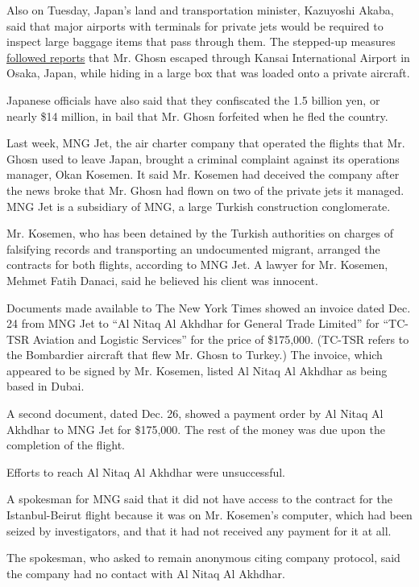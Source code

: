 Also on Tuesday, Japan's land and transportation minister, Kazuyoshi
Akaba, said that major airports with terminals for private jets would be
required to inspect large baggage items that pass through them. The
stepped-up measures
\href{https://www.nytimes.com/2019/12/31/business/carlos-ghosn.html}{followed
reports} that Mr. Ghosn escaped through Kansai International Airport in
Osaka, Japan, while hiding in a large box that was loaded onto a private
aircraft.

Japanese officials have also said that they confiscated the 1.5 billion
yen, or nearly \$14 million, in bail that Mr. Ghosn forfeited when he
fled the country.

Last week, MNG Jet, the air charter company that operated the flights
that Mr. Ghosn used to leave Japan, brought a criminal complaint against
its operations manager, Okan Kosemen. It said Mr. Kosemen had deceived
the company after the news broke that Mr. Ghosn had flown on two of the
private jets it managed. MNG Jet is a subsidiary of MNG, a large Turkish
construction conglomerate.

Mr. Kosemen, who has been detained by the Turkish authorities on charges
of falsifying records and transporting an undocumented migrant, arranged
the contracts for both flights, according to MNG Jet. A lawyer for Mr.
Kosemen, Mehmet Fatih Danaci, said he believed his client was innocent.

Documents made available to The New York Times showed an invoice dated
Dec. 24 from MNG Jet to ``Al Nitaq Al Akhdhar for General Trade
Limited'' for ``TC-TSR Aviation and Logistic Services'' for the price of
\$175,000. (TC-TSR refers to the Bombardier aircraft that flew Mr. Ghosn
to Turkey.) The invoice, which appeared to be signed by Mr. Kosemen,
listed Al Nitaq Al Akhdhar as being based in Dubai.

A second document, dated Dec. 26, showed a payment order by Al Nitaq Al
Akhdhar to MNG Jet for \$175,000. The rest of the money was due upon the
completion of the flight.

Efforts to reach Al Nitaq Al Akhdhar were unsuccessful.

A spokesman for MNG said that it did not have access to the contract for
the Istanbul-Beirut flight because it was on Mr. Kosemen's computer,
which had been seized by investigators, and that it had not received any
payment for it at all.

The spokesman, who asked to remain anonymous citing company protocol,
said the company had no contact with Al Nitaq Al Akhdhar.

